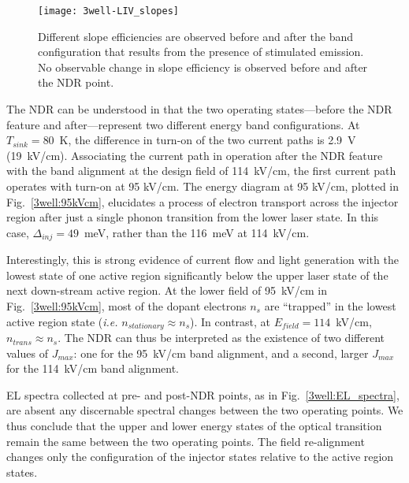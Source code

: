 \begin{figure}[tp]
\centering
\texttt{[image: 3well-LIV\_slopes]}
\caption[Three injector well LIV near $T_{sink}=130~\tn{K}$]{  Different slope efficiencies are observed before and after the band configuration that results from the presence of stimulated emission.  No observable change in slope efficiency is observed before and after the NDR point.}
\label{3well:LIV_slopes}
\end{figure}

The NDR can be understood in that the two operating states---before the NDR feature and after---represent two different energy band configurations.  At $T_{sink}=80$~K, the difference in turn-on of the two current paths is 2.9~V (19~kV/cm).  Associating the current path in operation after the NDR feature with the band alignment at the design field of 114~kV/cm, the first current path operates with turn-on at 95 kV/cm.  The energy diagram at 95 kV/cm, plotted in Fig.~\ref{3well:95kVcm}, elucidates a process of electron transport across the injector region after just a single phonon transition from the lower laser state.  In this case, $\Delta_{inj}=49$~meV, rather than the 116~meV at 114~kV/cm.

Interestingly, this is strong evidence of current flow and light generation with the lowest state of one active region significantly below the upper laser state of the next down-stream active region.  At the lower field of 95~kV/cm in Fig.~\ref{3well:95kVcm}, most of the dopant electrons $n_s$ are ``trapped'' in the lowest active region state (\emph{i.e.} $n_\textit{stationary}\approx n_s$).  In contrast, at $E_\textit{field}=114$~kV/cm, $n_\textit{trans}\approx n_s$.  %
The NDR can thus be interpreted as the existence of two different values of $J_{max}$: one for the 95~kV/cm band alignment, and a second, larger $J_{max}$ for the 114~kV/cm band alignment.

EL spectra collected at pre- and post-NDR points, as in Fig.~\ref{3well:EL_spectra}, are absent any discernable spectral changes between the two operating points.  We thus conclude that the upper and lower energy states of the optical transition remain the same between the two operating points.  The field re-alignment changes only the configuration of the injector states relative to the active region states.

